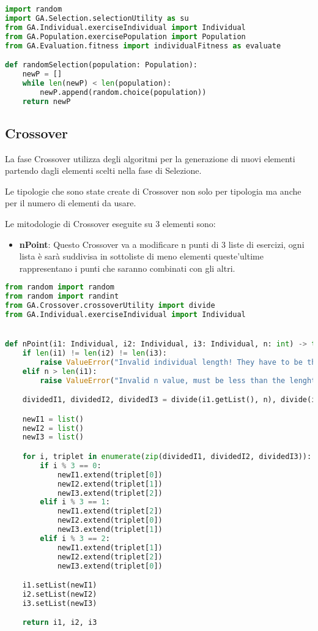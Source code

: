 \documentclass{article}
\begin{document}
\begin{lstlisting}[language=Python, breaklines, no caption]
import random
import GA.Selection.selectionUtility as su
from GA.Individual.exerciseIndividual import Individual
from GA.Population.exercisePopulation import Population
from GA.Evaluation.fitness import individualFitness as evaluate

def randomSelection(population: Population):
    newP = []
    while len(newP) < len(population):
        newP.append(random.choice(population))
    return newP
        \end{lstlisting}

\subsection{Crossover}

La fase Crossover utilizza degli algoritmi per la generazione di nuovi elementi partendo dagli elementi scelti nella fase di Selezione.

Le tipologie che sono state create di Crossover non solo per tipologia ma anche per il numero di elementi da usare.

Le mitodologie di Crossover eseguite su 3 elementi sono:

\begin{itemize}
\item\textbf{nPoint}: Questo Crossover va a modificare n punti di 3 liste di esercizi, ogni lista è sarà suddivisa in sottoliste di meno elementi queste'ultime rappresentano i punti che saranno combinati con gli altri.
\end{itemize}

\begin{lstlisting}[language=Python, breaklines, no caption]
from random import random
from random import randint
from GA.Crossover.crossoverUtility import divide
from GA.Individual.exerciseIndividual import Individual


def nPoint(i1: Individual, i2: Individual, i3: Individual, n: int) -> tuple[Individual, Individual, Individual]:
    if len(i1) != len(i2) != len(i3):
        raise ValueError("Invalid individual length! They have to be the same.")
    elif n > len(i1):
        raise ValueError("Invalid n value, must be less than the lenght of the individual!")

    dividedI1, dividedI2, dividedI3 = divide(i1.getList(), n), divide(i2.getList(), n), divide(i3.getList(), n)

    newI1 = list()
    newI2 = list()
    newI3 = list()

    for i, triplet in enumerate(zip(dividedI1, dividedI2, dividedI3)):
        if i % 3 == 0:
            newI1.extend(triplet[0])
            newI2.extend(triplet[1])
            newI3.extend(triplet[2])
        elif i % 3 == 1:
            newI1.extend(triplet[2])
            newI2.extend(triplet[0])
            newI3.extend(triplet[1])
        elif i % 3 == 2:
            newI1.extend(triplet[1])
            newI2.extend(triplet[2])
            newI3.extend(triplet[0])

    i1.setList(newI1)
    i2.setList(newI2)
    i3.setList(newI3)

    return i1, i2, i3
\end{lstlisting}
\end{document}
